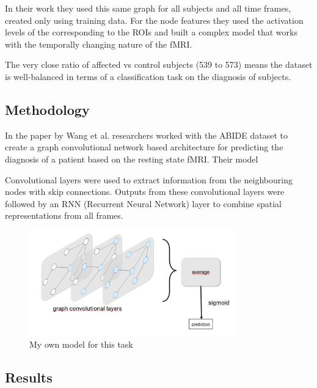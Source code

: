 	In their work they used this same graph for all subjects and all time frames, created only using training data. For the node features they used the activation levels of the corresponding to the ROIs and built a complex model that works with the temporally changing nature of the fMRI. 
	
	
	The very close ratio of affected vs control subjects (539 to 573) means the dataset is well-balanced in terms of a classification task on the diagnosis of subjects. 
	
	\subsection{Methodology}
	In the paper \cite{wang2021graph} by Wang et al. researchers worked with the ABIDE dataset to create a graph convolutional network based architecture for predicting the diagnosis of a patient based on the resting state fMRI. Their model 
	
	
	 Convolutional layers were used to extract information from the neighbouring nodes with skip connections. Outputs from these convolutional layers were followed by an RNN (Recurrent Neural Network) layer to combine spatial representations from all frames.
	
	\begin{figure}[!h]
		\centering
		\includegraphics[width=0.8\textwidth]{figures/onlab_abra.png}
		\caption{My own model for this task}
	\end{figure}
	
	\subsection{Results}
	
